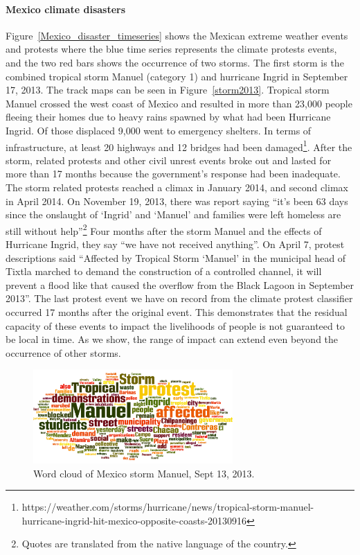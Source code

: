 \paragraph{Mexico climate disasters}
Figure~\ref{Mexico_disaster_timeseries} shows the Mexican extreme weather events and protests where the blue time series represents the climate protests events, and the two red bars shows the occurrence of two storms.
The first storm is the combined tropical storm Manuel (category 1) and hurricane Ingrid in September 17, 2013.
The track maps can be seen in Figure~\ref{storm2013}.
Tropical storm Manuel crossed the west coast of Mexico and resulted in more than 23,000 people fleeing their homes due to heavy rains spawned by what had been Hurricane Ingrid.
Of those displaced 9,000 went to emergency shelters.
In terms of infrastructure, at least 20 highways and 12 bridges had been damaged\footnote{https://weather.com/storms/hurricane/news/tropical-storm-manuel-hurricane-ingrid-hit-mexico-opposite-coasts-20130916}.
After the storm, related protests and other civil unrest events broke out and lasted for more than 17 months because the government's response had been inadequate.
The storm related protests reached a climax in January 2014, and second climax in April 2014.
On November 19, 2013, there was report saying ``it's been 63 days since the onslaught of `Ingrid' and `Manuel' and families were left homeless are still without help''\footnote{Quotes are translated from the native language of the country.}
Four months after the storm Manuel and the effects of Hurricane Ingrid, they say ``we have not received anything''.
On April 7, protest descriptions said ``Affected by Tropical Storm `Manuel' in the municipal head of Tixtla marched to demand the construction of a controlled channel, it will prevent a flood like that caused the overflow from the Black Lagoon in September 2013''.
The last protest event we have on record from the climate protest classifier occurred 17 months after the original event.
This demonstrates that the residual capacity of these events to impact the livelihoods of people is not guaranteed to be local in time.
As we show, the range of impact can extend even beyond the occurrence of other storms.

\begin{figure}[t]
\centerline
{\includegraphics[width=3in]{figures/Mexico_Manuel_wordcloud.png}}
\caption{Word cloud of Mexico storm Manuel, Sept 13, 2013.}
\label{Manuel_word_cloud}
\end{figure}



